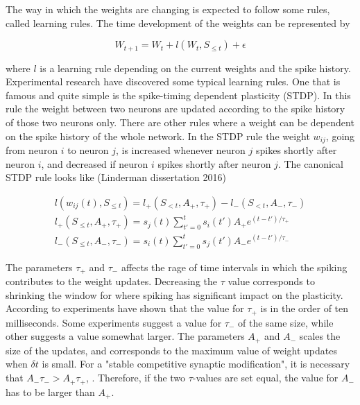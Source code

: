 The way in which the weights are changing is expected to follow some rules, called learning rules. The time development of the weights can be represented by

\begin{equation}
\label{eq:LR}
    W_{t+1} = W_t + l(W_t, S_{\leq t}) + \epsilon
\end{equation}

where $l$ is a learning rule depending on the current weights and the spike history. Experimental research have discovered some typical learning rules. One that is famous and quite simple is the spike-timing dependent plasticity (STDP). %
In this rule the weight between two neurons are updated according to the spike history of those two neurons only. There are other rules where a weight can be dependent on the spike history of the whole network. In the STDP rule the weight $w_{ij}$, going from neuron $i$ to neuron $j$, is increased whenever neuron $j$ spikes shortly after neuron $i$, and decreased if neuron $i$ spikes shortly after neuron $j$. The canonical STDP rule looks like (Linderman dissertation 2016)

\begin{equation}
\label{eq:STDP}
    \begin{split}
    l(w_{ij}(t), S_{\leq t}) = l_+(S_{<t}, A_+,\tau_+) - l_-(S_{<t}, A_-,\tau_-)\\ 
    l_+(S_{\leq t}, A_+,\tau_+) = s_j(t) \sum_{t'=0}^{t} s_i(t') A_+ e^{(t-t')/\tau_+}\\ 
    l_-(S_{\leq t}, A_-,\tau_-) = s_i(t) \sum_{t'=0}^{t} s_j(t') A_- e^{(t-t')/\tau_-}
    \end{split}
\end{equation}

The parameters $\tau_+$ and $\tau_-$ affects the rage of time intervals in which the spiking contributes to the weight updates. Decreasing the $\tau$ value corresponds to shrinking the window for where spiking has significant impact on the plasticity. According to \cite{Song} experiments have shown that the value for $\tau_+$ is in the order of ten milliseconds. Some experiments suggest a value for $\tau_-$ of the same size, while other suggests a value somewhat larger. The parameters $A_+$ and $A_-$ scales the size of the updates, and corresponds to the maximum value of weight updates when $\delta t$ is small. For a "stable competitive synaptic modification", it is necessary that $A_-\tau_- > A_+\tau_+$, \cite{Song}. Therefore, if the two $\tau$-values are set equal, the value for $A_-$ has to be larger than $A_+$.

